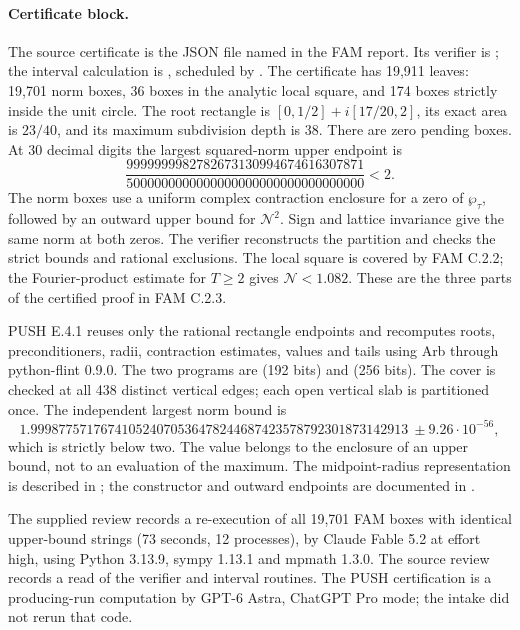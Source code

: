 \paragraph{Certificate block.}
The source certificate is the JSON file  named in the FAM report. Its verifier is ; the interval calculation is , scheduled by . The certificate has 19,911 leaves: 19,701 norm boxes, 36 boxes in the analytic local square, and 174 boxes strictly inside the unit circle. The root rectangle is $[0,1/2]+i[17/20,2]$, its exact area is $23/40$, and its maximum subdivision depth is 38. There are zero pending boxes. At 30 decimal digits the largest squared-norm upper endpoint is
\[
\frac{9999999982782673130994674616307871}
 {5000000000000000000000000000000000}<2.
\]
The norm boxes use a uniform complex contraction enclosure for a zero of $\wp_\tau$, followed by an outward upper bound for $\mathcal N^2$. Sign and lattice invariance give the same norm at both zeros. The verifier reconstructs the partition and checks the strict bounds and rational exclusions. The local square is covered by FAM C.2.2; the Fourier-product estimate for $T\ge2$ gives $\mathcal N<1.082$. These are the three parts of the certified proof in FAM C.2.3.

PUSH E.4.1 reuses only the rational rectangle endpoints and recomputes roots, preconditioners, radii, contraction estimates, values and tails using Arb through python-flint 0.9.0. The two programs are  (192 bits) and  (256 bits). The cover is checked at all 438 distinct vertical edges; each open vertical slab is partitioned once. The independent largest norm bound is
\[
1.999877571767410524070536478244687423578792301873142913
\ \pm9.26\cdot10^{-56},
\]
which is strictly below two. The value belongs to the enclosure of an upper bound, not to an evaluation of the maximum. The midpoint-radius representation is described in \cite[§§2--3]{Johansson2016}; the constructor and outward endpoints are documented in \cite[\texttt{arb}, \texttt{abs\_upper}, \texttt{upper}]{PythonFlint2026}.

The supplied review records a re-execution of all 19,701 FAM boxes with identical upper-bound strings (73 seconds, 12 processes), by Claude Fable 5.2 at effort high, using Python 3.13.9, sympy 1.13.1 and mpmath 1.3.0. The source review records a read of the verifier and interval routines. The PUSH certification is a producing-run computation by GPT-6 Astra, ChatGPT Pro mode; the intake did not rerun that code.

